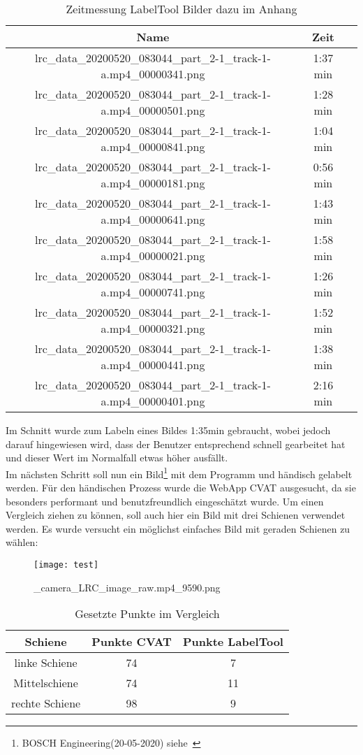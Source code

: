 \noindent
\begin{table}[h]
\begin{tabular}{c|c|c}
Name & Zeit &\\
\hline
lrc\_data\_20200520\_083044\_part\_2-1\_track-1-a.mp4\_00000341.png &  1:37 min \\
lrc\_data\_20200520\_083044\_part\_2-1\_track-1-a.mp4\_00000501.png &  1:28 min\\
lrc\_data\_20200520\_083044\_part\_2-1\_track-1-a.mp4\_00000841.png &  1:04 min \\
lrc\_data\_20200520\_083044\_part\_2-1\_track-1-a.mp4\_00000181.png &  0:56 min \\
lrc\_data\_20200520\_083044\_part\_2-1\_track-1-a.mp4\_00000641.png &  1:43 min  \\
lrc\_data\_20200520\_083044\_part\_2-1\_track-1-a.mp4\_00000021.png &  1:58 min \\
lrc\_data\_20200520\_083044\_part\_2-1\_track-1-a.mp4\_00000741.png &  1:26 min  \\
lrc\_data\_20200520\_083044\_part\_2-1\_track-1-a.mp4\_00000321.png &  1:52 min  \\
lrc\_data\_20200520\_083044\_part\_2-1\_track-1-a.mp4\_00000441.png &  1:38 min  \\
lrc\_data\_20200520\_083044\_part\_2-1\_track-1-a.mp4\_00000401.png &  2:16 min  \\
\end{tabular}
\caption{Zeitmessung LabelTool Bilder dazu im Anhang}
\end{table}

\noindent
Im Schnitt wurde zum Labeln eines Bildes 1:35min gebraucht, wobei jedoch darauf hingewiesen wird, dass der Benutzer entsprechend schnell gearbeitet hat und dieser Wert im Normalfall etwas höher ausfällt.
\\

\noindent
Im nächsten Schritt soll nun ein Bild\footnote{BOSCH Engineering(20-05-2020) siehe~\cite{0520}} mit dem Programm und händisch gelabelt werden. Für den händischen Prozess wurde die WebApp CVAT ausgesucht, da sie besonders performant und benutzfreundlich eingeschätzt wurde. Um einen Vergleich ziehen zu können, soll auch hier ein Bild mit drei Schienen verwendet werden. Es wurde versucht ein möglichst einfaches Bild mit geraden Schienen zu wählen:
\begin{figure}[H]
  \texttt{[image: test]}
  \caption{\_camera\_LRC\_image\_raw.mp4\_9590.png}
\end{figure}
\begin{table}
\begin{tabular}[h]{c|c|c}
Schiene & Punkte CVAT & Punkte LabelTool \\
\hline
linke Schiene & 74 &  7\\
Mittelschiene & 74 &  11\\
rechte Schiene & 98 & 9\\
\end{tabular}
\caption{Gesetzte Punkte im Vergleich}
\end{table}

